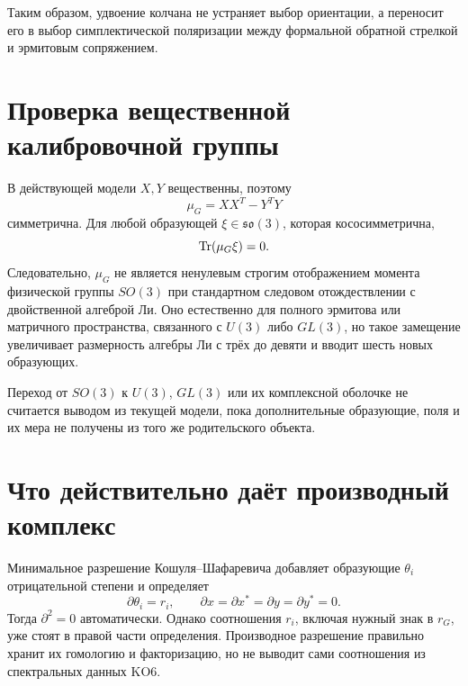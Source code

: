 Таким образом, удвоение колчана не устраняет выбор ориентации, а переносит
его в выбор симплектической поляризации между формальной обратной стрелкой
и эрмитовым сопряжением.

\section{Проверка вещественной калибровочной группы}

В действующей модели \(X,Y\) вещественны, поэтому
\begin{equation}
 \mu_G=XX^T-Y^TY
\end{equation}
симметрична. Для любой образующей \(\xi\in\mathfrak{so}(3)\), которая
кососимметрична,
\begin{equation}
 \operatorname{Tr}(\mu_G\xi)=0.
 \label{eq:v5-derived-so3-zero-pairing}
\end{equation}
Следовательно, \(\mu_G\) не является ненулевым строгим отображением момента
физической группы \(SO(3)\) при стандартном следовом отождествлении с
двойственной алгеброй Ли. Оно естественно для полного эрмитова или
матричного пространства, связанного с \(U(3)\) либо \(GL(3)\), но такое
замещение увеличивает размерность алгебры Ли с трёх до девяти и вводит шесть
новых образующих.

\begin{nogocriterion}
Переход от \(SO(3)\) к \(U(3)\), \(GL(3)\) или их комплексной оболочке не
считается выводом из текущей модели, пока дополнительные образующие, поля и
их мера не получены из того же родительского объекта.
\end{nogocriterion}

\section{Что действительно даёт производный комплекс}

Минимальное разрешение Кошуля--Шафаревича добавляет образующие
\(\theta_i\) отрицательной степени и определяет
\begin{equation}
 \partial\theta_i=r_i,\qquad
 \partial x=\partial x^*=\partial y=\partial y^*=0.
 \label{eq:v5-derived-koszul-rule}
\end{equation}
Тогда \(\partial^2=0\) автоматически. Однако соотношения \(r_i\), включая
нужный знак в \(r_G\), уже стоят в правой части определения. Производное
разрешение правильно хранит их гомологию и факторизацию, но не выводит сами
соотношения из спектральных данных KO6.

